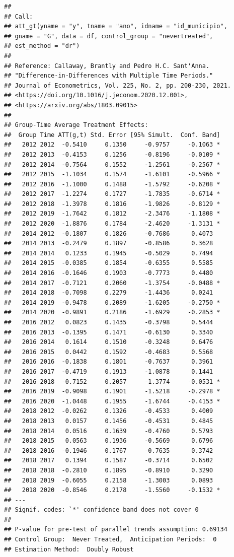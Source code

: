 \documentclass[portugues]{article}
\begin{document}
\begin{box_code}
\begin{verbatim}
## 
## Call:
## att_gt(yname = "y", tname = "ano", idname = "id_municipio", 
## gname = "G", data = df, control_group = "nevertreated",
## est_method = "dr") 
## 
## Reference: Callaway, Brantly and Pedro H.C. Sant'Anna.  
## "Difference-in-Differences with Multiple Time Periods." 
## Journal of Econometrics, Vol. 225, No. 2, pp. 200-230, 2021. 
## <https://doi.org/10.1016/j.jeconom.2020.12.001>, 
## <https://arxiv.org/abs/1803.09015>  
##
## Group-Time Average Treatment Effects:
##  Group Time ATT(g,t) Std. Error [95% Simult.  Conf. Band]  
##   2012 2012  -0.5410     0.1350     -0.9757     -0.1063 *
##   2012 2013  -0.4153     0.1256     -0.8196     -0.0109 *
##   2012 2014  -0.7564     0.1552     -1.2561     -0.2567 *
##   2012 2015  -1.1034     0.1574     -1.6101     -0.5966 *
##   2012 2016  -1.1000     0.1488     -1.5792     -0.6208 *
##   2012 2017  -1.2274     0.1727     -1.7835     -0.6714 *
##   2012 2018  -1.3978     0.1816     -1.9826     -0.8129 *
##   2012 2019  -1.7642     0.1812     -2.3476     -1.1808 *
##   2012 2020  -1.8876     0.1784     -2.4620     -1.3131 *
##   2014 2012  -0.1807     0.1826     -0.7686      0.4073  
##   2014 2013  -0.2479     0.1897     -0.8586      0.3628  
##   2014 2014   0.1233     0.1945     -0.5029      0.7494  
##   2014 2015  -0.0385     0.1854     -0.6355      0.5585  
##   2014 2016  -0.1646     0.1903     -0.7773      0.4480  
##   2014 2017  -0.7121     0.2060     -1.3754     -0.0488 *
##   2014 2018  -0.7098     0.2279     -1.4436      0.0241  
##   2014 2019  -0.9478     0.2089     -1.6205     -0.2750 *
##   2014 2020  -0.9891     0.2186     -1.6929     -0.2853 *
##   2016 2012   0.0823     0.1435     -0.3798      0.5444  
##   2016 2013  -0.1395     0.1471     -0.6130      0.3340  
##   2016 2014   0.1614     0.1510     -0.3248      0.6476  
##   2016 2015   0.0442     0.1592     -0.4683      0.5568  
##   2016 2016  -0.1838     0.1801     -0.7637      0.3961  
##   2016 2017  -0.4719     0.1913     -1.0878      0.1441  
##   2016 2018  -0.7152     0.2057     -1.3774     -0.0531 *
##   2016 2019  -0.9098     0.1901     -1.5218     -0.2978 *
##   2016 2020  -1.0448     0.1955     -1.6744     -0.4153 *
##   2018 2012  -0.0262     0.1326     -0.4533      0.4009  
##   2018 2013   0.0157     0.1456     -0.4531      0.4845  
##   2018 2014   0.0516     0.1639     -0.4760      0.5793  
##   2018 2015   0.0563     0.1936     -0.5669      0.6796  
##   2018 2016  -0.1946     0.1767     -0.7635      0.3742  
##   2018 2017   0.1394     0.1587     -0.3714      0.6502  
##   2018 2018  -0.2810     0.1895     -0.8910      0.3290  
##   2018 2019  -0.6055     0.2158     -1.3003      0.0893  
##   2018 2020  -0.8546     0.2178     -1.5560     -0.1532 *
## ---
## Signif. codes: `*' confidence band does not cover 0
## 
## P-value for pre-test of parallel trends assumption: 0.69134
## Control Group:  Never Treated,  Anticipation Periods:  0
## Estimation Method:  Doubly Robust


\end{verbatim}
\end{box_code}
\end{document}

